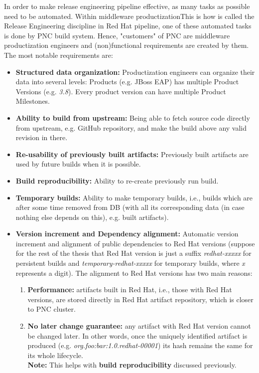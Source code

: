 \documentclass[../main.tex]{subfiles}
\begin{document}
In order to make release engineering pipeline effective, as many tasks as possible need to be automated. Within middleware productization{This is how is called the Release Engineering discipline in Red Hat} pipeline, one of these automated tasks is done by PNC build system. Hence, "customers" of PNC are middleware productization engineers and (non)functional requirements are created by them. The most notable requirements are:

\begin{itemize}
  \item \textbf{Structured data organization:} Productization engineers can
organize their data into several levels: Products (e.g. JBoss EAP) has multiple Product Versions (e.g. \textit{3.8}). Every product version can have multiple Product Milestones.

  \item \textbf{Ability to build from upstream:} Being able to fetch source code directly from upstream, e.g. GitHub repository, and make the build above any valid revision in there.

  \item \textbf{Re-usability of previously built artifacts:} Previously built artifacts are used by future builds when it is possible.

  \item \textbf{Build reproducibility:} Ability to re-create previously run build.

  \item \textbf{Temporary builds:} Ability to make temporary builds, i.e., builds which are after some time removed from DB (with all its corresponding data (in case nothing else depends on this), e.g. built artifacts).

  \item \textbf{Version increment and Dependency alignment:} Automatic version increment and alignment of public dependencies to Red Hat versions (suppose for the rest of the thesis that Red Hat version is just a suffix \textit{redhat-xxxxx} for persistent builds and \textit{temporary-redhat-xxxxx} for temporary builds, where \textit{x} represents a digit). The alignment to Red Hat versions has two main reasons:
  \begin{enumerate}
      \item \textbf{Performance:} artifacts built in Red Hat, i.e., those with Red Hat versions, are stored directly in Red Hat artifact repository, which is closer to PNC cluster.

      \item \textbf{No later change guarantee:} any artifact with Red Hat version cannot be changed later. In other words, once the uniquely identified artifact is produced (e.g. \textit{org.foo:bar:1.0.redhat-00001}) its hash remains the same for its whole lifecycle.\\
      \textbf{Note:} This helps with \textbf{build reproducibility} discussed previously.
  \end{enumerate}


\end{itemize}
\end{document}
